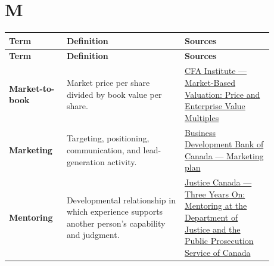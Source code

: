 \documentclass[11pt,letterpaper,oneside,openany]{book}
\begin{document}
\section[M]{M}
\begin{center}
\small
\setlength{\LTpre}{0.4em}
\setlength{\LTpost}{0.8em}
\begin{longtable}{>{\RaggedRight\arraybackslash}p{0.180\linewidth}>{\RaggedRight\arraybackslash}p{0.400\linewidth}>{\RaggedRight\arraybackslash}p{0.300\linewidth}}
\rowcolor{DeepNavy}
\color{white}\bfseries Term & \color{white}\bfseries Definition & \color{white}\bfseries Sources \\
\endfirsthead
\rowcolor{DeepNavy}
\color{white}\bfseries Term & \color{white}\bfseries Definition & \color{white}\bfseries Sources \\
\endhead
\textbf{Market-to-book} & Market price per share divided by book value per share. & \href{https://www.cfainstitute.org/insights/professional-learning/refresher-readings/2026/market-based-valuation-price-enterprise-value-multiples}{CFA Institute --- Market-Based Valuation: Price and Enterprise Value Multiples} \\
\textbf{Marketing} & Targeting, positioning, communication, and lead-generation activity. & \href{https://www.bdc.ca/en/articles-tools/entrepreneur-toolkit/templates-business-guides/glossary/marketing-plan}{Business Development Bank of Canada --- Marketing plan} \\
\textbf{Mentoring} & Developmental relationship in which experience supports another person's capability and judgment. & \href{https://justice.canada.ca/eng/rp-pr/other-autre/rr12\_1/p1.html}{Justice Canada --- Three Years On: Mentoring at the Department of Justice and the Public Prosecution Service of Canada} \\
\end{longtable}
\end{center}
\end{document}
